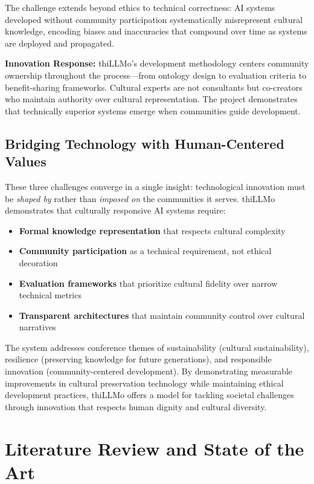 \documentclass[a4paper,11pt]{article}
\begin{document}
The challenge extends beyond ethics to technical correctness: AI systems developed without community participation systematically misrepresent cultural knowledge, encoding biases and inaccuracies that compound over time as systems are deployed and propagated.

\textbf{Innovation Response:} thiLLMo's development methodology centers community ownership throughout the process—from ontology design to evaluation criteria to benefit-sharing frameworks. Cultural experts are not consultants but co-creators who maintain authority over cultural representation. The project demonstrates that technically superior systems emerge when communities guide development.

\subsection{Bridging Technology with Human-Centered Values}

These three challenges converge in a single insight: technological innovation must be \emph{shaped by} rather than \emph{imposed on} the communities it serves. thiLLMo demonstrates that culturally responsive AI systems require:
\begin{itemize}
    \item \textbf{Formal knowledge representation} that respects cultural complexity
    \item \textbf{Community participation} as a technical requirement, not ethical decoration
    \item \textbf{Evaluation frameworks} that prioritize cultural fidelity over narrow technical metrics
    \item \textbf{Transparent architectures} that maintain community control over cultural narratives
\end{itemize}

The system addresses conference themes of sustainability (cultural sustainability), resilience (preserving knowledge for future generations), and responsible innovation (community-centered development). By demonstrating measurable improvements in cultural preservation technology while maintaining ethical development practices, thiLLMo offers a model for tackling societal challenges through innovation that respects human dignity and cultural diversity.

\section{Literature Review and State of the Art}
\end{document}
